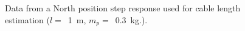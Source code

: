 
\begin{figure}
    \captionsetup[subfigure]{justification=centering}
    \centering
    \caption{ Data from a North position step response used for cable length estimation 
    ($l =$~\SI{1}{\metre}, $m_p =$~\SI{0.3}{\kilo\gram}.).}
    \label{fig:FFT_pos_step_subfigs}  
\end{figure}